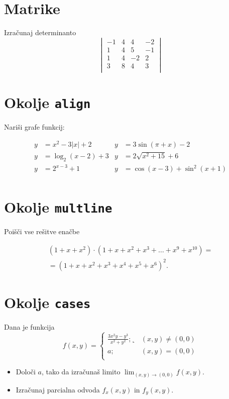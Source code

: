 \documentclass[a4paper,12pt]{article}
\begin{document}
\section*{Matrike}
Izračunaj determinanto
   \[
   \begin{vmatrix}
       -1 & 4 & 4 & -2 \\
       1 & 4 & 5 & -1 \\
       1 & 4 & -2 & 2 \\
       3 & 8 & 4 & 3 \\
   
   \end{vmatrix}
   \]
\section*{Okolje \texttt{align}}
Nariši grafe funkcij:


\begin{align*}
   y &= x^2 - 3|x| + 2   & y &= 3 \sin(\pi+x) - 2 \\
   y &= \log_2(x-2) + 3  & y &= 2 \sqrt{x^2+15} + 6 \\
   y &= 2^{x-3} + 1      & y &= \cos(x-3) + \sin^2(x+1) \\
\end{align*}


\section*{Okolje \texttt{multline}}
Poišči vse rešitve enačbe


\begin{multline*}
   (1+x+x^2) \cdot (1+x+x^2+x^3+\ldots+x^9+x^{10}) = \\
   =(1+x+x^2+x^3+x^4+x^5+x^6)^2.
\end{multline*}


\section*{Okolje \texttt{cases}}
Dana je funkcija
\[
   f(x, y)= 
   \begin{cases}
   \frac{3x^2y-y^3}{x^2+y^2}; ˛&(x, y) \neq (0,0) \\ a; & (x,y) =(0,0) \\
   \end{cases}
\]
\begin{itemize}
\item Določi \(a\), tako da izračunaš limito \( \lim_{(x,y)\to(0,0)} f(x,y) \).
\item Izračunaj parcialna odvoda \(f_x(x,y)\) in \(f_y(x,y)\).
\end{itemize}
\end{document}
